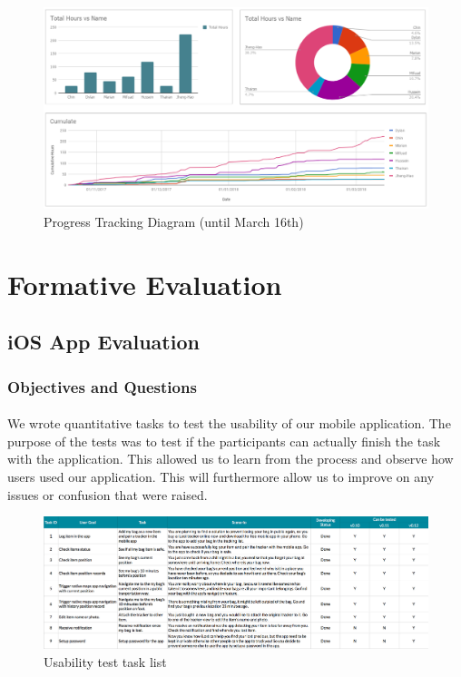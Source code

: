 \documentclass[12pt,a4paper]{article}
\begin{document}
          \begin{figure}[H]
            \centering
            \includegraphics[width=1\textwidth]{../assets/development-records-progress-tracking-diagram.png}
            \caption{Progress Tracking Diagram (until March 16th)}
            \label{fig:Progress Tracking Diagram}
          \end{figure}

    \section{Formative Evaluation}
      \label{Chapter:Formative Evaluation}
      \subsection{iOS App Evaluation} 
        
        \subsubsection{Objectives and Questions}
          \paragraph{}
            We wrote quantitative tasks to test the usability of our mobile application\cite{WritingTasks}. The purpose of the tests was to test if the participants can actually finish the task with the application. This allowed us to learn from the process and observe how users used our application. This will furthermore allow us to improve on any issues or confusion that were raised.

            \begin{figure}[H]
              \centering
              \includegraphics[width=1\textwidth]{../assets/usability-test-task-list.png}
              \caption{Usability test task list}
              \label{fig:Usability test task list}
            \end{figure}
\end{document}
